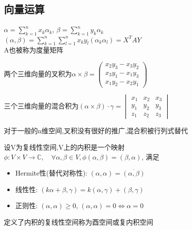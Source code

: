 \subsection{向量运算}
\begin{tcolorbox}
    [colback=Emerald!10,colframe=cyan!40!black,title=\textbf{一般内积}]
    $\alpha = \sum\limits_{k=1}^{n} x_{k}\alpha_{k}$, $\beta = \sum\limits_{k=1}^{n} y_{k}\alpha_{k}$\\
    $(\alpha,\beta) = \sum\limits_{k=1}^{n} \sum\limits_{l=1}^{n}x_{k}y_{l}(\alpha_{k}\alpha_{l}) = X^{T}AY$\\
    A也被称为度量矩阵
\end{tcolorbox}
\begin{tcolorbox}
    [colback=Emerald!10,colframe=cyan!40!black,title=\textbf{叉积}]
    两个三维向量的叉积为$
    \alpha \times \beta = 
    \begin{pmatrix}
        x_{2}y_{3} - x_{3}y_{2}\\
        x_{3}y_{1} - x_{1}y_{3}\\
        x_{1}y_{2} - x_{2}y_{1}
    \end{pmatrix}$
\end{tcolorbox}
\begin{tcolorbox}
    [colback=Emerald!10,colframe=cyan!40!black,title=\textbf{混合积}]
    三个三维向量的混合积为$
    (\alpha \times \beta) \cdot \gamma =
    \begin{vmatrix}
        x_{1} & x_{2} & x_{3}\\
        y_{1} & y_{2} & y_{3}\\
        z_{1} & z_{2} & z_{3}
    \end{vmatrix}$
\end{tcolorbox}
对于一般的n维空间,叉积没有很好的推广,混合积被行列式替代
\begin{tcolorbox}
    [colback=Emerald!10,colframe=cyan!40!black,title=\textbf{酉空间}]
    设V为复线性空间,V上的内积是一个映射$\phi : V \times V \rightarrow \mathbb{C},\quad
    \forall \alpha, \beta \in V, \phi(\alpha, \beta) = (\beta, \alpha)$, 满足
    \begin{itemize}
        \item Hermite性(替代对称性): $(\alpha, \alpha) = \overline{(\alpha, \beta)}$
        \item 线性性: $(k\alpha + \beta, \gamma) = k(\alpha, \gamma)+(\beta, \gamma)$
        \item 正则性: $(\alpha, \alpha) \geq 0$, $(\alpha, \alpha) = 0 \Leftrightarrow \alpha = 0$
    \end{itemize}
    定义了内积的复线性空间称为酉空间或复内积空间
    
\end{tcolorbox}